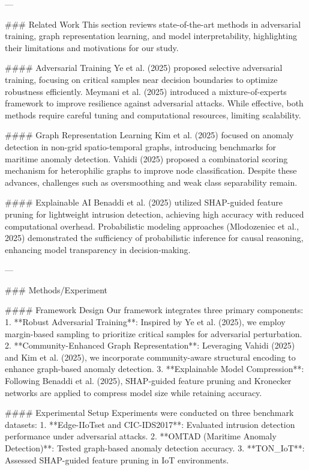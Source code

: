 ---

### Related Work  
This section reviews state-of-the-art methods in adversarial training, graph representation learning, and model interpretability, highlighting their limitations and motivations for our study.

#### Adversarial Training  
Ye et al. (2025) proposed selective adversarial training, focusing on critical samples near decision boundaries to optimize robustness efficiently. Meymani et al. (2025) introduced a mixture-of-experts framework to improve resilience against adversarial attacks. While effective, both methods require careful tuning and computational resources, limiting scalability.

#### Graph Representation Learning  
Kim et al. (2025) focused on anomaly detection in non-grid spatio-temporal graphs, introducing benchmarks for maritime anomaly detection. Vahidi (2025) proposed a combinatorial scoring mechanism for heterophilic graphs to improve node classification. Despite these advances, challenges such as oversmoothing and weak class separability remain.

#### Explainable AI  
Benaddi et al. (2025) utilized SHAP-guided feature pruning for lightweight intrusion detection, achieving high accuracy with reduced computational overhead. Probabilistic modeling approaches (Mlodozeniec et al., 2025) demonstrated the sufficiency of probabilistic inference for causal reasoning, enhancing model transparency in decision-making.

---

### Methods/Experiment  

#### Framework Design  
Our framework integrates three primary components:  
1. **Robust Adversarial Training**: Inspired by Ye et al. (2025), we employ margin-based sampling to prioritize critical samples for adversarial perturbation.  
2. **Community-Enhanced Graph Representation**: Leveraging Vahidi (2025) and Kim et al. (2025), we incorporate community-aware structural encoding to enhance graph-based anomaly detection.  
3. **Explainable Model Compression**: Following Benaddi et al. (2025), SHAP-guided feature pruning and Kronecker networks are applied to compress model size while retaining accuracy.

#### Experimental Setup  
Experiments were conducted on three benchmark datasets:  
1. **Edge-IIoTset and CIC-IDS2017**: Evaluated intrusion detection performance under adversarial attacks.  
2. **OMTAD (Maritime Anomaly Detection)**: Tested graph-based anomaly detection accuracy.  
3. **TON_IoT**: Assessed SHAP-guided feature pruning in IoT environments.

